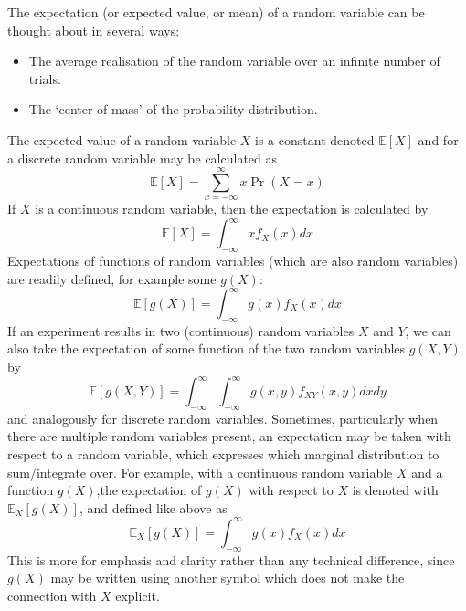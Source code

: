 \documentclass[11pt]{report} %
\begin{document}
The expectation (or expected value, or mean) of a random variable can be thought about in several ways:
\begin{itemize}
\item The average realisation of the random variable over an infinite number of trials.
\item The `center of mass' of the probability distribution.
\end{itemize}
The expected value of a random variable $X$ is a constant denoted $\mathbb{E}\left[X\right]$ and for a discrete random variable may be calculated as
\begin{equation}
\mathbb{E}\left[X\right] = \sum_{x = -\infty}^{\infty}x\operatorname{Pr}\left(X = x\right)
\end{equation}
If $X$ is a continuous random variable, then the expectation is calculated by
\begin{equation}
\mathbb{E}\left[X\right] = \int_{-\infty}^{\infty}xf_{X}\left(x\right)dx
\end{equation}
Expectations of functions of random variables (which are also random variables) are readily defined, for example some $g\left(X\right)$:
\begin{equation}
\mathbb{E}\left[g\left(X\right)\right] = \int_{-\infty}^{\infty}g\left(x\right)f_{X}\left(x\right)dx
\end{equation}
If an experiment results in two (continuous) random variables $X$ and $Y$, we can also take the expectation of some function of the two random variables $g\left(X, Y\right)$ by
\begin{equation}
\mathbb{E}\left[g\left(X, Y\right)\right] = \int_{-\infty}^{\infty}\int_{-\infty}^{\infty}g\left(x, y\right)f_{XY}\left(x, y\right)dxdy
\end{equation}
and analogously for discrete random variables. Sometimes, particularly when there are multiple random variables present, an expectation may be taken with respect to a random variable, which expresses which marginal distribution to sum/integrate over. For example, with a continuous random variable $X$ and a function $g\left(X\right)$,the expectation of $g\left(X\right)$ with respect to $X$ is denoted with $\mathbb{E}_{X}\left[g\left(X\right)\right]$, and defined like above as
\begin{equation}
\mathbb{E}_{X}\left[g\left(X\right)\right] = \int_{-\infty}^{\infty}g\left(x\right)f_{X}\left(x\right)dx
\end{equation}
This is more for emphasis and clarity rather than any technical difference, since $g\left(X\right)$ may be written using another symbol which does not make the connection with $X$ explicit.
\end{document}
